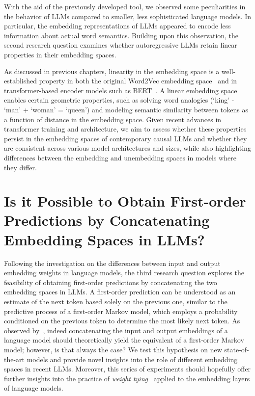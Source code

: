 With the aid of the previously developed tool, we observed some peculiarities in the behavior of LLMs compared to smaller, less sophisticated language models.
In particular, the embedding representations of LLMs appeared to encode less information about actual word semantics.
Building upon this observation, the second research question examines whether autoregressive LLMs retain linear properties in their embedding spaces.

As discussed in previous chapters, linearity in the embedding space is a well-established property in both the original Word2Vec embedding space~\cite{mikolov2013} and in transformer-based encoder models such as BERT~\cite{devlin2019}.
A linear embedding space enables certain geometric properties, such as solving word analogies (`king' - `man' + `woman' = `queen') and modeling semantic similarity between tokens as a function of distance in the embedding space.
Given recent advances in transformer training and architecture, we aim to assess whether these properties persist in the embedding spaces of contemporary causal LLMs and whether they are consistent across various model architectures and sizes, while also highlighting differences between the embedding and unembedding spaces in models where they differ.

\section{Is it Possible to Obtain First-order \texorpdfstring{ \\ }{} \mbox{Predictions} by \mbox{Concatenating} \texorpdfstring{ \\ }{} Embedding Spaces in LLMs?}\label{sec:rq_fom}

Following the investigation on the differences between input and output embedding weights in language models, the third research question explores the feasibility of obtaining first-order predictions by concatenating the two embedding spaces in LLMs.
A first-order prediction can be understood as an estimate of the next token based solely on the previous one, similar to the predictive process of a first-order Markov model, which employs a probability conditioned on the previous token to determine the most likely next token.
As observed by~\citet{elhage2021}, indeed concatenating the input and output embeddings of a language model should theoretically yield the equivalent of a first-order Markov model; however, is that always the case?
We test this hypothesis on new state-of-the-art models and provide novel insights into the role of different embedding spaces in recent LLMs.
Moreover, this series of experiments should hopefully offer further insights into the practice of \emph{weight tying}~\cite{inan2017,press2017} applied to the embedding layers of language models.
